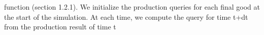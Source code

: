 \documentclass[12pt,a4paper]{article}%
\begin{document}
\begin{appendix}
function (section 1.2.1).  We initialize the production queries for each final good at the start of the simulation. At each time, we compute the query for time t+dt from the production result of time t%

\end{appendix}
\end{document}
